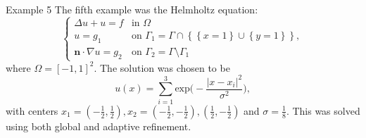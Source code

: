\documentclass[9pt]{beamer}
\newcommand{\abs}[1]{\left\vert#1\right\vert}
\newcommand{\set}[1]{\left\{#1\right\}}
\newcommand{\grad}{\nabla}
\begin{document}
\begin{frame}{Example 5}
The fifth example was the Helmholtz equation:
$$
\begin{cases}
\Delta u + u = f &\text{in }\Omega\\
u = g_1 & \text{on }\Gamma_1 = \Gamma \cap \set{\set{x=1}\cup\set{y=1}},\\
\mathbf{n}\cdot \grad u = g_2 & \text{on }\Gamma_2 = \Gamma\setminus \Gamma_1
\end{cases}
$$
where $\Omega = [-1,1]^2$. The solution was chosen to be
$$
	u(x) = \sum_{i=1}^3 \text{exp}\bigg(-\frac{\abs{x-x_i}^2}{\sigma^2}\bigg),
$$
with centers $x_1 = (-\frac{1}{2}, \frac{1}{2}), x_2=(-\frac{1}{2}, -\frac{1}{2}),(\frac{1}{2}, -\frac{1}{2})$ and $\sigma = \frac{1}{8}$. This was solved using both global and adaptive refinement. 
\end{frame}
\end{document}
